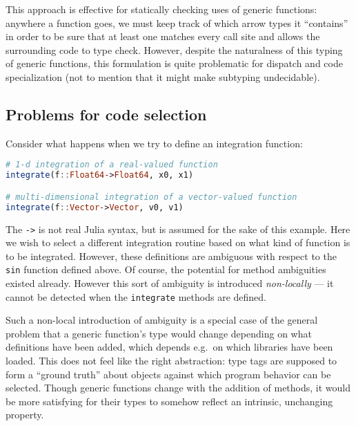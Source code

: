 This approach is effective for statically checking uses of generic
functions: anywhere a function goes, we must keep track of which arrow
types it ``contains'' in order to be sure that at least one matches
every call site and allows the surrounding code to type check.
However, despite the naturalness of this typing of generic functions,
this formulation is quite problematic for dispatch and code specialization
(not to mention that it might make subtyping undecidable).

\subsection{Problems for code selection}

Consider what happens when we try to define an integration function:

\begin{singlespace}
\begin{lstlisting}[language=julia]
# 1-d integration of a real-valued function
integrate(f::Float64->Float64, x0, x1)

# multi-dimensional integration of a vector-valued function
integrate(f::Vector->Vector, v0, v1)
\end{lstlisting}
\end{singlespace}

\noindent
The \texttt{->} is not real Julia syntax, but is assumed for the sake of
this example.
Here we wish to select a different integration routine based on what
kind of function is to be integrated.
However, these definitions are ambiguous with respect to the \texttt{sin}
function defined above.
Of course, the potential for method ambiguities existed already.
However this sort of ambiguity is introduced \emph{non-locally} ---
it cannot be detected when the \texttt{integrate} methods are defined.


Such a non-local introduction of ambiguity is a special case of the
general problem that a generic function's type would change depending
on what definitions have been added, which depends e.g.\ on which libraries
have been loaded.
This does not feel like the right abstraction:
type tags are supposed to form a ``ground truth'' about objects against
which program behavior can be selected.
Though generic functions change with the addition of methods, it would be more
satisfying for their types to somehow reflect an intrinsic, unchanging
property.


